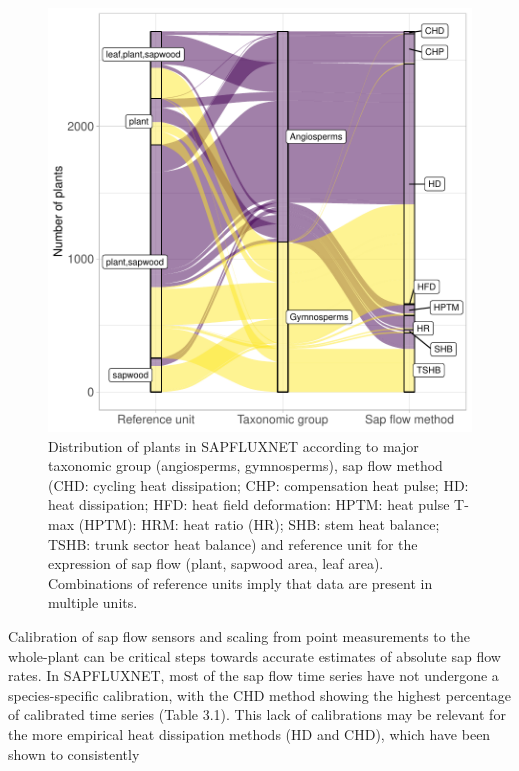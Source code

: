 \documentclass[11pt,twoside]{reedthesis}
\begin{document}
\setlength{\abovecaptionskip}{0pt}
\begin{figure}[hbt!]

{\centering \includegraphics[width=1\linewidth]{figure/CH3/Figure4} 

}

\caption[Distribution of plants according to major taxonomic group and sap flow method.]{Distribution of plants in SAPFLUXNET according to major taxonomic group (angiosperms, gymnosperms), sap flow method (CHD: cycling heat dissipation; CHP: compensation heat pulse; HD: heat dissipation; HFD: heat field deformation: HPTM: heat pulse T-max (HPTM): HRM: heat ratio (HR); SHB: stem heat balance; TSHB: trunk sector heat balance) and reference unit for the expression of sap flow (plant, sapwood area, leaf area). Combinations of reference units imply that data are present in multiple units.}\label{fig:Ch2plot4}
\end{figure}
Calibration of sap flow sensors and scaling from point measurements to
the whole-plant can be critical steps towards accurate estimates of
absolute sap flow rates. In SAPFLUXNET, most of the sap flow time series
have not undergone a species-specific calibration, with the CHD method
showing the highest percentage of calibrated time series (Table 3.1).
This lack of calibrations may be relevant for the more empirical heat
dissipation methods (HD and CHD), which have been shown to consistently
\end{document}
